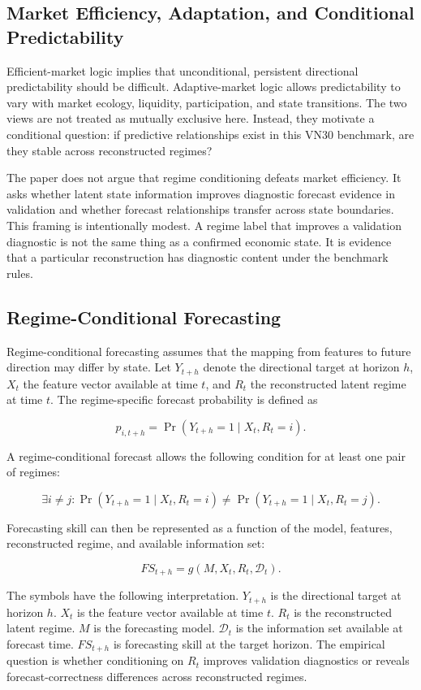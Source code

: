 \documentclass[12pt,a4paper]{article}
\begin{document}
\subsection{Market Efficiency, Adaptation, and Conditional Predictability}

Efficient-market logic implies that unconditional, persistent directional predictability should be difficult. Adaptive-market logic allows predictability to vary with market ecology, liquidity, participation, and state transitions. The two views are not treated as mutually exclusive here. Instead, they motivate a conditional question: if predictive relationships exist in this VN30 benchmark, are they stable across reconstructed regimes?

The paper does not argue that regime conditioning defeats market efficiency. It asks whether latent state information improves diagnostic forecast evidence in validation and whether forecast relationships transfer across state boundaries. This framing is intentionally modest. A regime label that improves a validation diagnostic is not the same thing as a confirmed economic state. It is evidence that a particular reconstruction has diagnostic content under the benchmark rules.

\subsection{Regime-Conditional Forecasting}

Regime-conditional forecasting assumes that the mapping from features to future direction may differ by state. Let \(Y_{t+h}\) denote the directional target at horizon \(h\), \(X_t\) the feature vector available at time \(t\), and \(R_t\) the reconstructed latent regime at time \(t\). The regime-specific forecast probability is defined as

\[
p_{i,t+h} = \Pr(Y_{t+h}=1 \mid X_t, R_t=i).
\]

A regime-conditional forecast allows the following condition for at least one pair of regimes:

\[
\exists i \neq j:
\Pr(Y_{t+h}=1 \mid X_t, R_t=i)
\neq
\Pr(Y_{t+h}=1 \mid X_t, R_t=j).
\]

Forecasting skill can then be represented as a function of the model, features, reconstructed regime, and available information set:

\[
FS_{t+h} = g(M, X_t, R_t, \mathcal{D}_t).
\]

The symbols have the following interpretation. \(Y_{t+h}\) is the directional target at horizon \(h\). \(X_t\) is the feature vector available at time \(t\). \(R_t\) is the reconstructed latent regime. \(M\) is the forecasting model. \(\mathcal{D}_t\) is the information set available at forecast time. \(FS_{t+h}\) is forecasting skill at the target horizon. The empirical question is whether conditioning on \(R_t\) improves validation diagnostics or reveals forecast-correctness differences across reconstructed regimes.
\end{document}
